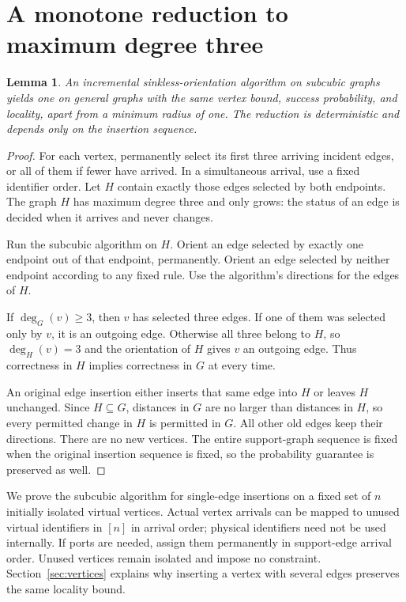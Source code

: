 \documentclass[11pt]{article}
\newtheorem{lemma}[theorem]{Lemma}
\theoremstyle{definition}
\begin{document}
\section{A monotone reduction to maximum degree three}\label{sec:reduction}

\begin{lemma}\label{lem:degree-reduction}
An incremental sinkless-orientation algorithm on subcubic graphs yields one
on general graphs with the same vertex bound, success probability, and
locality, apart from a minimum radius of one. The reduction is deterministic
and depends only on the insertion sequence.
\end{lemma}
\begin{proof}
For each vertex, permanently select its first three arriving incident edges,
or all of them if fewer have arrived. In a simultaneous arrival, use a fixed
identifier order. Let $H$ contain exactly those edges selected by both
endpoints. The graph $H$ has maximum degree three and only grows: the status
of an edge is decided when it arrives and never changes.

Run the subcubic algorithm on $H$. Orient an edge selected by exactly one
endpoint out of that endpoint, permanently. Orient an edge selected by
neither endpoint according to any fixed rule. Use the algorithm's directions
for the edges of $H$.

If $\deg_G(v)\ge3$, then $v$ has selected three edges. If one of them was
selected only by $v$, it is an outgoing edge. Otherwise all three belong to
$H$, so $\deg_H(v)=3$ and the orientation of $H$ gives $v$ an outgoing edge.
Thus correctness in $H$ implies correctness in $G$ at every time.

An original edge insertion either inserts that same edge into $H$ or leaves
$H$ unchanged. Since $H\subseteq G$, distances in $G$ are no larger than
distances in $H$, so every permitted change in $H$ is permitted in $G$.
All other old edges keep their directions. There are no new vertices. The
entire support-graph sequence is fixed when the original insertion sequence
is fixed, so the probability guarantee is preserved as well.
\end{proof}

We prove the subcubic algorithm for single-edge insertions on a fixed set of
$n$ initially isolated virtual vertices. Actual vertex arrivals can be mapped
to unused virtual identifiers in $[n]$ in arrival order; physical identifiers
need not be used internally. If ports are needed, assign them permanently
in support-edge arrival order. Unused vertices remain isolated and impose
no constraint. Section~\ref{sec:vertices} explains why
inserting a vertex with several edges preserves the same locality bound.
\end{document}
